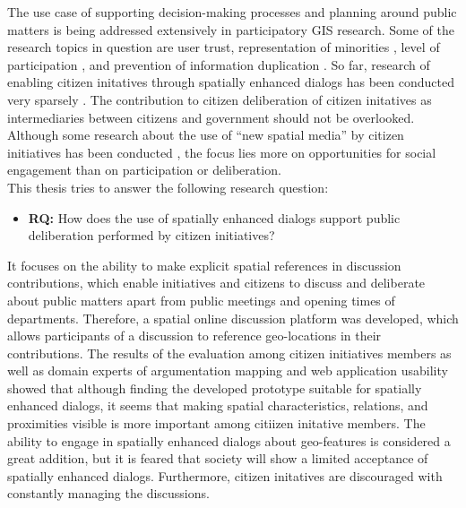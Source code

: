 The use case of supporting decision-making processes and planning around public matters is being addressed extensively in participatory GIS research. Some of the research topics in question are user trust, representation of minorities \cite{Carver2001_PPGIS_Cyberdemocracy}, level of participation \cite{Steinmann2005_Combination_Ladder_GIS}, and prevention of information duplication \cite{Hopfer2007_Communication}. So far, research of enabling citizen initatives through spatially enhanced dialogs has been conducted very sparsely \cite{Cai2009_spatial_annotation_deliberation}. The contribution to citizen deliberation of citizen initatives as intermediaries between citizens and government should not be overlooked. Although some research about the use of ``new spatial media'' by citizen initiatives has been conducted \cite{Elwood2013_NewSpatialMedia}, the focus lies more on opportunities for social engagement than on participation or deliberation.\\
This thesis tries to answer the following research question:
\begin{itemize}
  \item[] \textbf{RQ:} How does the use of spatially enhanced dialogs support public deliberation performed by citizen initiatives?
\end{itemize}
It focuses on the ability to make explicit spatial references in discussion contributions, which enable initiatives and citizens to discuss and deliberate about public matters apart from public meetings and opening times of departments. Therefore, a spatial online discussion platform was developed, which allows participants of a discussion to reference geo-locations in their contributions.  The results of the evaluation among citizen initiatives members as well as domain experts of argumentation mapping and web application usability showed that although finding the developed prototype suitable for spatially enhanced dialogs, it seems that making spatial characteristics, relations, and proximities visible is more important among citiizen initative members. The ability to engage in spatially enhanced dialogs about geo-features is considered a great addition, but it is feared that society will show a limited acceptance of spatially enhanced dialogs.
Furthermore, citizen initatives are discouraged with constantly managing the discussions.\\
